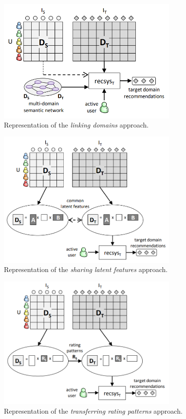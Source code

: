 \begin{figure}[H]
\centering
\includegraphics[width=0.8\textwidth]{pictures/linking-domains}
\caption{Representation of the \textit{linking domains} approach. \cite{10.1007/978-1-4899-7637-6_27}}
\label{fg:linking-domains}
\end{figure}
\begin{figure}[H]
\centering
\includegraphics[width=0.8\textwidth]{pictures/sharing-latent-features}
\caption{Representation of the \textit{sharing latent features} approach. \cite{10.1007/978-1-4899-7637-6_27}}
\label{fg:sharing-latent-features}
\end{figure}
\begin{figure}[H]
\centering
\includegraphics[width=0.8\textwidth]{pictures/transferring-rating-patterns}
\caption{Representation of the \textit{transferring rating patterns} approach. \cite{10.1007/978-1-4899-7637-6_27}}
\label{fg:transferring-rating-patterns}
\end{figure}



